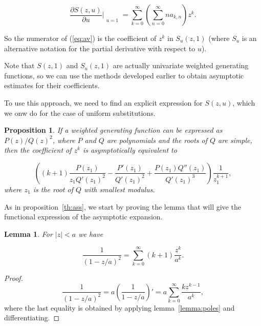 \documentclass{article}
\newtheorem{lemma}{Lemma}
\newtheorem{proposition}{Proposition}
\begin{document}
\begin{equation*}
\frac{\partial S(z,u)}{\partial u} \Bigr|_{\substack{\\u=1}} =
\sum_{k=0}^\infty \left( \sum_{n=0}^\infty na_{k,n} \right) z^k.
\end{equation*}

So the numerator of (\ref{eq:av}) is the coefficient of $z^k$ in
$S_u(z,1)$ (where $S_u$ is an alternative notation for the partial
derivative with respect to $u$).

Note that $S(z,1)$ and $S_u(z,1)$ are
actually univariate weighted generating functions, so we can use the
methods developed earlier to obtain asymptotic estimates for their
coefficients.

To use this approach, we need to find an explicit expression for $S(z,u)$,
which we onw do for the case of uniform substitutions.





\begin{proposition}
\label{th:ass2}
If a weighted generating function can be expressed as $P(z)/Q(z)^2$, where
$P$ and $Q$ are polynomials and the roots of $Q$ are simple, then the
coefficient of $z^k$ is asymptotically equivalent to

\begin{equation}
\label{eq:ass2}
\left( (k+1)\frac{P(z_1)}{z_1 Q'(z_1)^2} - \frac{P'(z_1)}{Q'(z_1)^2} +
\frac{P(z_1)Q''(z_1)}{Q'(z_1)^3} \right)
\frac{1}{z_1^{k+1}},
\end{equation}
where $z_1$ is the root of $Q$ with smallest \textit{modulus}.
\end{proposition}

As in proposition~\ref{th:ass}, we start by proving the lemma that will
give the functional expression of the asymptotic expansion.

\begin{lemma}
\label{lemma:poles2}
For $|z| < a$ we have

\begin{equation}
\label{eq:poles2}
\frac{1}{(1-z/a)^2} = \sum_{k=0}^\infty (k+1)\frac{z^k}{a^k}.
\end{equation}
\end{lemma}

\begin{proof}
\begin{equation*}
\frac{1}{(1-z/a)^2} = a \left( \frac{1}{1-z/a} \right)'
= a \sum_{k=0}^\infty \frac{kz^{k-1}}{a^k},
\end{equation*}
where the last equality is obtained by applying lemma~\ref{lemma:poles}
and differentiating.
\end{proof}
\end{document}
